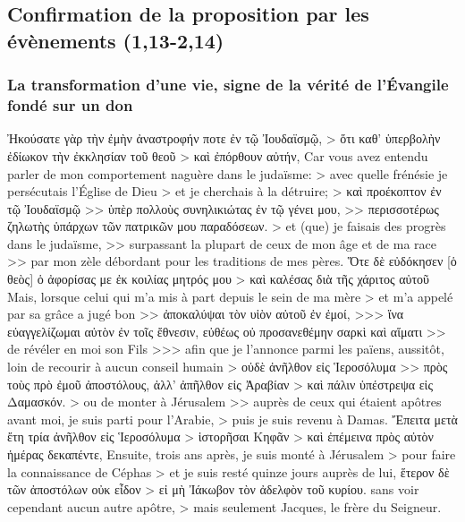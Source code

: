 \documentclass[14pt,a4paper,twoside]{extarticle}
\begin{document}
\begin{paracol}[1]
  \subsection*{Confirmation de la proposition par les évènements (1,13-2,14)}
  \subsubsection*{La transformation d'une vie, signe de la vérité de l'Évangile fondé sur un don}
  \verset
  {Ἠκούσατε γὰρ τὴν ἐμὴν ἀναστροφήν ποτε ἐν τῷ Ἰουδαϊσμῷ,
    > ὅτι καθ’ ὑπερβολὴν ἐδίωκον τὴν ἐκκλησίαν τοῦ θεοῦ
    > καὶ ἐπόρθουν αὐτήν,}
  {Car vous avez entendu parler de mon comportement naguère dans le judaïsme:
    > avec quelle frénésie je persécutais l’Église de Dieu
    > et je cherchais à la détruire;}
  \verset
  {> καὶ προέκοπτον ἐν τῷ Ἰουδαϊσμῷ
    >> ὑπὲρ πολλοὺς συνηλικιώτας ἐν τῷ γένει μου,
    >> περισσοτέρως ζηλωτὴς ὑπάρχων τῶν πατρικῶν μου παραδόσεων.}
  {> et (que) je faisais des progrès dans le judaïsme,
    >> surpassant la plupart de ceux de mon âge et de ma race
    >> par mon zèle débordant pour les traditions de mes pères.}
  \verset
  {Ὅτε δὲ εὐδόκησεν [ὁ θεὸς] ὁ ἀφορίσας με ἐκ κοιλίας μητρός μου
    > καὶ καλέσας διὰ τῆς χάριτος αὐτοῦ}
  {Mais, lorsque celui qui m’a mis à part depuis le sein de ma mère
    > et m’a appelé par sa grâce
    a jugé bon}
  \verset
  {>> ἀποκαλύψαι τὸν υἱὸν αὐτοῦ ἐν ἐμοί,
    >>> ἵνα εὐαγγελίζωμαι αὐτὸν ἐν τοῖς ἔθνεσιν,
    εὐθέως οὐ προσανεθέμην σαρκὶ καὶ αἵματι}
  {>> de révéler en moi son Fils
    >>> afin que je l’annonce parmi les païens,
    aussitôt, loin de recourir à aucun conseil humain}
  \verset
  {> οὐδὲ ἀνῆλθον εἰς Ἱεροσόλυμα
    >> πρὸς τοὺς πρὸ ἐμοῦ ἀποστόλους,
    ἀλλ’ ἀπῆλθον εἰς Ἀραβίαν
    > καὶ πάλιν ὑπέστρεψα εἰς Δαμασκόν.}
  {> ou de monter à Jérusalem
    >> auprès de ceux qui étaient apôtres avant moi,
    je suis parti pour l’Arabie,
    > puis je suis revenu à Damas.}
  \verset
  {Ἔπειτα μετὰ ἔτη τρία ἀνῆλθον εἰς Ἱεροσόλυμα
    > ἱστορῆσαι Κηφᾶν
    > καὶ ἐπέμεινα πρὸς αὐτὸν ἡμέρας δεκαπέντε,}
  {Ensuite, trois ans après, je suis monté à Jérusalem
    > pour faire la connaissance de Céphas
    > et je suis resté quinze jours auprès de lui,}
  \verset
  {ἕτερον δὲ τῶν ἀποστόλων οὐκ εἶδον
    > εἰ μὴ Ἰάκωβον τὸν ἀδελφὸν τοῦ κυρίου.}
  {sans voir cependant aucun autre apôtre,
    > mais seulement Jacques, le frère du Seigneur.}

\end{paracol}
\end{document}
